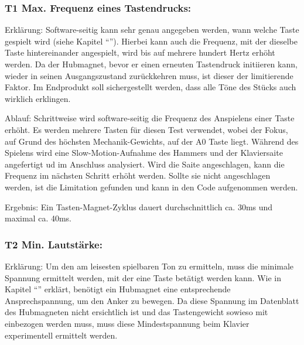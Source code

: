\subsubsection{T1 Max. Frequenz eines Tastendrucks:}

Erklärung: Software-seitig kann sehr genau angegeben werden, wann welche Taste gespielt wird (siehe Kapitel \enquote{}).
Hierbei kann auch die Frequenz, mit der dieselbe Taste hintereinander angespielt, wird bis auf mehrere hundert Hertz erhöht werden.
Da der Hubmagnet, bevor er einen erneuten Tastendruck initiieren kann, wieder in seinen Ausgangszustand zurückkehren muss, ist dieser der limitierende Faktor.
Im Endprodukt soll sichergestellt werden, dass alle Töne des Stücks auch wirklich erklingen. %

Ablauf: Schrittweise wird software-seitig die Frequenz des Anspielens einer Taste erhöht.
Es werden mehrere Tasten für diesen Test verwendet, wobei der Fokus, auf Grund des höchsten Mechanik-Gewichts, auf der A0 Taste liegt. %
Während des Spielens wird eine Slow-Motion-Aufnahme des Hammers und der Klaviersaite angefertigt ud im Anschluss analysiert.
Wird die Saite angeschlagen, kann die Frequenz im nächsten Schritt erhöht werden.
Sollte sie nicht angeschlagen werden, ist die Limitation gefunden und kann in den Code aufgenommen werden.

Ergebnis: Ein Tasten-Magnet-Zyklus dauert durchschnittlich ca. 30ms und maximal ca. 40ms.

\subsubsection{T2 Min. Lautstärke:}

Erklärung: Um den am leisesten spielbaren Ton zu ermitteln, muss die minimale Spannung ermittelt werden, mit der eine Taste betätigt werden kann.
Wie in Kapitel \enquote{} erklärt, benötigt ein Hubmagnet eine entsprechende Ansprechspannung, um den Anker zu bewegen.
Da diese Spannung im Datenblatt des Hubmagneten nicht ersichtlich ist und das Tastengewicht sowieso mit einbezogen werden muss, muss diese Mindestspannung beim Klavier experimentell ermittelt werden.

